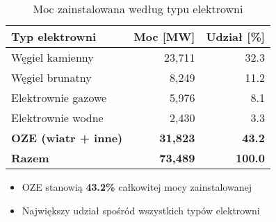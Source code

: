 \begin{table}
    \centering
    \tiny %
    \setlength{\tabcolsep}{3pt} %
    \begin{tabular}{>{\raggedright\arraybackslash}p{4.2cm}rr}
        \toprule
        \textbf{Typ elektrowni} & \textbf{Moc [MW]} & \textbf{Udział [\%]} \\
        \midrule
        Węgiel kamienny & 23,711 & 32.3 \\
        Węgiel brunatny & 8,249 & 11.2 \\
        Elektrownie gazowe & 5,976 & 8.1 \\
        Elektrownie wodne & 2,430 & 3.3 \\
        \textcolor{renewable}{\textbf{OZE (wiatr + inne)}} & \textcolor{renewable}{\textbf{31,823}} & \textcolor{renewable}{\textbf{43.2}} \\
        \midrule
        \textbf{Razem} & \textbf{73,489} & \textbf{100.0} \\
        \bottomrule
    \end{tabular}
    \caption{\footnotesize Moc zainstalowana według typu elektrowni}
\end{table}


\begin{itemize}[leftmargin=*, itemsep=0.1em]
    \item[\footnotesize\faIcon{leaf}] {\footnotesize OZE stanowią \textbf{43.2\%} całkowitej mocy zainstalowanej}
    \item[\footnotesize\faIcon{chart-line}] {\footnotesize Największy udział spośród wszystkich typów elektrowni}
\end{itemize}